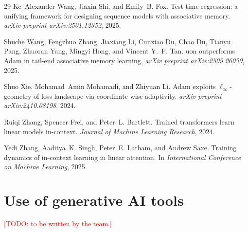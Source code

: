 \documentclass{article}
\newcommand{\todo}[1]{\textcolor{red}{[#1]}}
\begin{document}
\begin{thebibliography}{29}
Ke~Alexander Wang, Jiaxin Shi, and Emily~B. Fox.
\newblock Test-time regression: a unifying framework for designing sequence
  models with associative memory.
\newblock \emph{arXiv preprint arXiv:2501.12352}, 2025{}.

Shuche Wang, Fengzhuo Zhang, Jiaxiang Li, Cunxiao Du, Chao Du, Tianyu Pang,
  Zhuoran Yang, Mingyi Hong, and Vincent Y.~F. Tan.
uon outperforms {A}dam in tail-end associative memory learning.
\newblock \emph{arXiv preprint arXiv:2509.26030}, 2025{}.

Shuo Xie, Mohamad~Amin Mohamadi, and Zhiyuan Li.
\newblock Adam exploits $\ell_\infty$-geometry of loss landscape via
  coordinate-wise adaptivity.
\newblock \emph{arXiv preprint arXiv:2410.08198}, 2024.

Ruiqi Zhang, Spencer Frei, and Peter~L. Bartlett.
\newblock Trained transformers learn linear models in-context.
\newblock \emph{Journal of Machine Learning Research}, 2024.

Yedi Zhang, Aaditya~K. Singh, Peter~E. Latham, and Andrew Saxe.
\newblock Training dynamics of in-context learning in linear attention.
\newblock In \emph{International Conference on Machine Learning}, 2025.

\end{thebibliography}

\appendix
\section{Use of generative AI tools}
\label{app:ai}
\todo{TODO: to be written by the team.}
\end{document}
